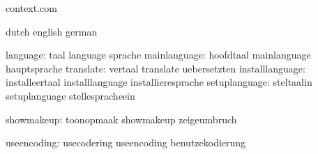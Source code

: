 


\startlogginginterface context.com



\startcommands                  dutch                        english
                                german

                     language:  taal                         language
                                sprache
                 mainlanguage:  hoofdtaal                    mainlanguage
                                hauptsprache
                    translate:  vertaal                      translate
                                uebersetzten
              installlanguage:  installeertaal               installlanguage
                                installieresprache
                setuplanguage:  steltaalin                   setuplanguage
                                stellespracheein

                   showmakeup:  toonopmaak                   showmakeup
                                zeigeumbruch

                  useencoding:  usecodering                  useencoding
                                benutzekodierung


